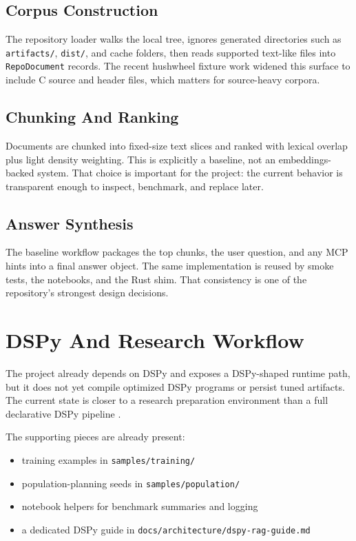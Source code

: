 \documentclass[11pt]{article}
\begin{document}
\subsection{Corpus Construction}

The repository loader walks the local tree, ignores generated directories such as
\texttt{artifacts/}, \texttt{dist/}, and cache folders, then reads supported text-like files into
\texttt{RepoDocument} records. The recent hushwheel fixture work widened this surface to include
C source and header files, which matters for source-heavy corpora.

\subsection{Chunking And Ranking}

Documents are chunked into fixed-size text slices and ranked with lexical overlap plus light
density weighting. This is explicitly a baseline, not an embeddings-backed system. That choice is
important for the project: the current behavior is transparent enough to inspect, benchmark, and
replace later.

\subsection{Answer Synthesis}

The baseline workflow packages the top chunks, the user question, and any MCP hints into a final
answer object. The same implementation is reused by smoke tests, the notebooks, and the Rust
shim. That consistency is one of the repository's strongest design decisions.

\section{DSPy And Research Workflow}

The project already depends on DSPy and exposes a DSPy-shaped runtime path, but it does not yet
compile optimized DSPy programs or persist tuned artifacts. The current state is closer to a
research preparation environment than a full declarative DSPy pipeline \cite{khattab2024dspy}.

The supporting pieces are already present:

\begin{itemize}
  \item training examples in \texttt{samples/training/}
  \item population-planning seeds in \texttt{samples/population/}
  \item notebook helpers for benchmark summaries and logging
  \item a dedicated DSPy guide in \texttt{docs/architecture/dspy-rag-guide.md}
\end{itemize}
\end{document}
